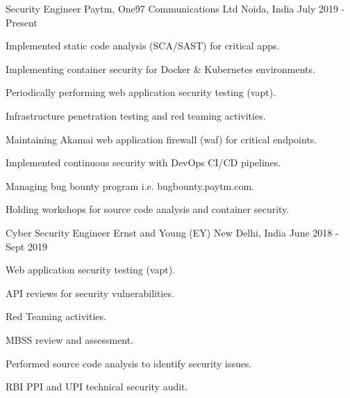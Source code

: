 

\begin{cventries}

  \cventry
    {Security Engineer} %
    {Paytm, One97 Communications Ltd} %
    {Noida, India} %
    {July 2019 - Present} %
    {
      \begin{cvitems} %
        \item {Implemented static code analysis (SCA/SAST) for critical apps.}
        \item {Implementing container security for Docker \& Kubernetes environments.}
        \item {Periodically performing web application security testing (vapt).}
        \item {Infrastructure penetration testing and red teaming activities.}
        \item {Maintaining Akamai web application firewall (waf) for critical endpoints.}
        \item {Implemented continuous security with DevOps CI/CD pipelines.}
        \item {Managing bug bounty program i.e. bugbounty.paytm.com.}
        \item {Holding workshops for source code analysis and container security.}
      \end{cvitems}
    }

  \cventry
    {Cyber Security Engineer} %
    {Ernst and Young (EY)} %
    {New Delhi, India} %
    {June 2018 - Sept 2019} %
    {
      \begin{cvitems} %
        \item {Web application security testing (vapt).}
        \item {API reviews for security vulnerabilities.}
        \item {Red Teaming activities.}
        \item {MBSS review and assessment.}
        \item {Performed source code analysis to identify security issues.}
        \item {RBI PPI and UPI technical security audit.}
      \end{cvitems}
    }


\end{cventries}
